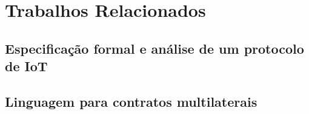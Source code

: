 \chapter{Trabalhos Relacionados}

\section{Especificação formal e análise de um protocolo de IoT}

\section{Linguagem para contratos multilaterais}